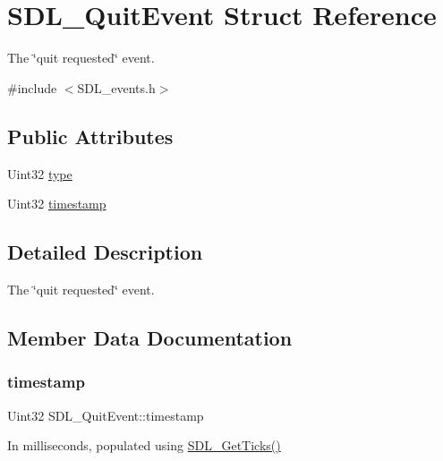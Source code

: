 \hypertarget{structSDL__QuitEvent}{}\section{S\+D\+L\+\_\+\+Quit\+Event Struct Reference}
\label{structSDL__QuitEvent}


The \char`\"{}quit requested\char`\"{} event.  




{\ttfamily \#include $<$S\+D\+L\+\_\+events.\+h$>$}

\subsection*{Public Attributes}
\begin{DoxyCompactItemize}
\item 
Uint32 \hyperlink{structSDL__QuitEvent_a51ab0279e6de40249ba93971a8757cf0}{type}
\item 
Uint32 \hyperlink{structSDL__QuitEvent_a7acd4fa42ca96da8edac146baaa0b433}{timestamp}
\end{DoxyCompactItemize}


\subsection{Detailed Description}
The \char`\"{}quit requested\char`\"{} event. 

\subsection{Member Data Documentation}
\mbox{\label{structSDL__QuitEvent_a7acd4fa42ca96da8edac146baaa0b433}} 
\subsubsection{\texorpdfstring{timestamp}{timestamp}}
{\footnotesize\ttfamily Uint32 S\+D\+L\+\_\+\+Quit\+Event\+::timestamp}

In milliseconds, populated using \hyperlink{SDL__timer_8h_a0b9bc71d6287e0ffafdc3419760fe2b3}{S\+D\+L\+\_\+\+Get\+Ticks()} \mbox{\label{structSDL__QuitEvent_a51ab0279e6de40249ba93971a8757cf0}} 
